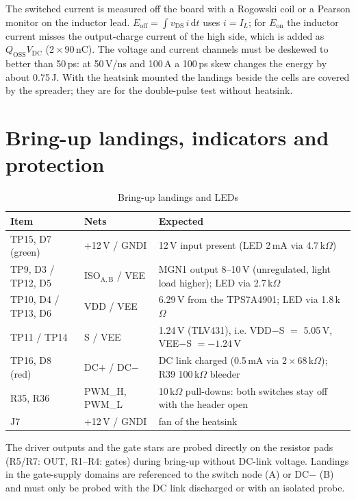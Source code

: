 \documentclass[10pt,a4paper]{article}
\begin{document}
The switched current is measured off the board with a Rogowski coil or a Pearson monitor on the inductor lead. $E_\mathrm{off}=\int v_\mathrm{DS}\,i\,\mathrm{d}t$ uses $i=I_L$; for $E_\mathrm{on}$ the inductor current misses the output-charge current of the high side, which is added as $Q_\mathrm{OSS}V_\mathrm{DC}$ (2\,$\times$\,90\,nC). The voltage and current channels must be deskewed to better than 50\,ps: at 50\,V/ns and 100\,A a 100\,ps skew changes the energy by about 0.75\,\textmu J. With the heatsink mounted the landings beside the cells are covered by the spreader; they are for the double-pulse test without heatsink.

\section{Bring-up landings, indicators and protection}
\begin{table}[H]
\centering\small
\caption{Bring-up landings and LEDs}\label{tab:bringup}
\begin{tabularx}{\textwidth}{@{}llX@{}}
\toprule
Item & Nets & Expected \\
\midrule
TP15, D7 (green) & +12\,V / GNDI & 12\,V input present (LED 2\,mA via 4.7\,k$\Omega$) \\
TP9, D3 / TP12, D5 & ISO$_\mathrm{A,B}$ / VEE & MGN1 output 8--10\,V (unregulated, light load higher); LED via 2.7\,k$\Omega$ \\
TP10, D4 / TP13, D6 & VDD / VEE & 6.29\,V from the TPS7A4901; LED via 1.8\,k$\Omega$ \\
TP11 / TP14 & S / VEE & 1.24\,V (TLV431), i.e. VDD$-$S $=$ 5.05\,V, VEE$-$S $=-1.24$\,V \\
TP16, D8 (red) & DC$+$ / DC$-$ & DC link charged (0.5\,mA via 2\,$\times$\,68\,k$\Omega$); R39 100\,k$\Omega$ bleeder \\
R35, R36 & PWM\_H, PWM\_L & 10\,k$\Omega$ pull-downs: both switches stay off with the header open \\
J7 & +12\,V / GNDI & fan of the heatsink \\
\bottomrule
\end{tabularx}
\end{table}
The driver outputs and the gate stars are probed directly on the resistor pads (R5/R7: OUT, R1--R4: gates) during bring-up without DC-link voltage. Landings in the gate-supply domains are referenced to the switch node (A) or DC$-$ (B) and must only be probed with the DC link discharged or with an isolated probe.
\end{document}
